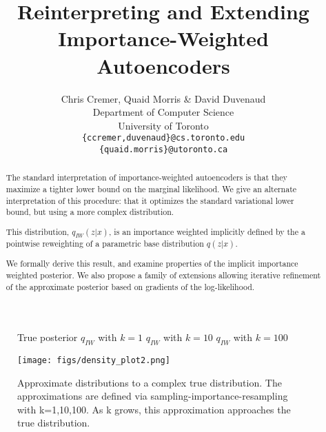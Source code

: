 \documentclass{article} %
\title{Reinterpreting and Extending \\ Importance-Weighted Autoencoders}
\author{Chris Cremer, Quaid Morris \& David Duvenaud \\
Department of Computer Science\\
University of Toronto\\
\texttt{\{ccremer,duvenaud\}@cs.toronto.edu} \\
\texttt{\{quaid.morris\}@utoronto.ca}
}
\begin{document}
\maketitle

\begin{abstract}
The standard interpretation of importance-weighted autoencoders is that they maximize a tighter lower bound on the marginal likelihood.
We give an alternate interpretation of this procedure: that it optimizes the standard variational lower bound, but using a more complex distribution. 

This distribution, $q_{IW}(z|x)$, is an importance weighted  implicitly defined by the  a pointwise reweighting of a parametric base distribution $q(z|x)$.

We formally derive this result, and examine properties of the implicit importance weighted posterior.
We also propose a family of extensions allowing iterative refinement of the approximate posterior based on gradients of the log-likelihood.
\end{abstract}
 

\begin{figure}[b]
  \centering
  True posterior \qquad $q_{IW}$ with $k=1$  \qquad $q_{IW}$ with $k=10$  \qquad $q_{IW}$ with $k=100$
  
      \texttt{[image: figs/density\_plot2.png]}
  \caption{Approximate distributions to a complex true distribution. The approximations are defined via sampling-importance-resampling with k=1,10,100. As k grows, this approximation approaches the true distribution.}
  \label{viz1}
\end{figure}
\end{document}
